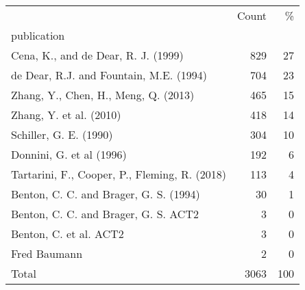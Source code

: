\begin{tabular}{lrr}
\toprule
 & Count & \% \\
publication &  &  \\
\midrule
Cena, K., and de Dear, R. J. (1999) & 829 & 27 \\
de Dear, R.J. and Fountain, M.E. (1994) & 704 & 23 \\
Zhang, Y., Chen, H., Meng, Q. (2013) & 465 & 15 \\
Zhang, Y. et al. (2010) & 418 & 14 \\
Schiller, G. E. (1990) & 304 & 10 \\
Donnini, G. et al (1996) & 192 & 6 \\
Tartarini, F., Cooper, P., Fleming, R. (2018) & 113 & 4 \\
Benton, C. C. and Brager, G. S. (1994) & 30 & 1 \\
Benton, C. C. and Brager, G. S. ACT2 & 3 & 0 \\
Benton, C. et al. ACT2 & 3 & 0 \\
Fred Baumann & 2 & 0 \\
Total & 3063 & 100 \\
\bottomrule
\end{tabular}
